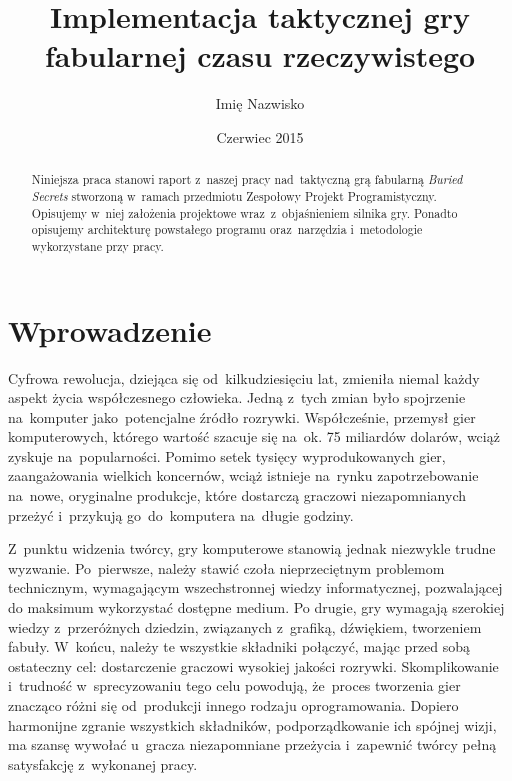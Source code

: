 \documentclass[licencjacka]{pracamgr}
\author	{Imię Nazwisko}
\title{Implementacja taktycznej gry fabularnej czasu rzeczywistego}
\date{Czerwiec 2015}
\begin{document}
\maketitle

\begin{abstract}
  Niniejsza praca stanowi raport z~naszej pracy nad~taktyczną grą fabularną \emph{Buried Secrets} stworzoną w~ramach przedmiotu Zespołowy Projekt
  Programistyczny. Opisujemy w~niej założenia projektowe wraz~z~objaśnieniem silnika gry. Ponadto opisujemy architekturę 
  powstałego programu oraz~narzędzia i~metodologie wykorzystane przy pracy.
\end{abstract}

\tableofcontents

\chapter*{Wprowadzenie}
  Cyfrowa rewolucja, dziejąca się od~kilkudziesięciu lat, zmieniła niemal każdy aspekt życia współczesnego człowieka.
  Jedną z~tych zmian było spojrzenie na~komputer jako~potencjalne źródło rozrywki. Współcześnie, przemysł
  gier komputerowych, którego wartość szacuje się na~ok. 75 miliardów dolarów\cite{CA}, wciąż zyskuje na~popularności.
  Pomimo setek tysięcy wyprodukowanych gier, zaangażowania wielkich koncernów, wciąż istnieje na~rynku zapotrzebowanie
  na~nowe, oryginalne produkcje, które dostarczą graczowi niezapomnianych przeżyć i~przykują go~do~komputera na~długie godziny.

  Z~punktu widzenia twórcy, gry komputerowe stanowią jednak niezwykle trudne wyzwanie. Po~pierwsze, należy stawić czoła
  nieprzeciętnym problemom technicznym, wymagającym wszechstronnej wiedzy informatycznej, pozwalającej do maksimum wykorzystać
  dostępne medium. Po drugie, gry wymagają szerokiej wiedzy z~przeróżnych dziedzin, związanych
  z~grafiką, dźwiękiem, tworzeniem fabuły. W~końcu, należy te wszystkie składniki połączyć, mając przed sobą ostateczny cel: dostarczenie
  graczowi wysokiej jakości rozrywki. Skomplikowanie i~trudność w~sprecyzowaniu tego celu powodują, że~proces tworzenia gier
  znacząco różni się od~produkcji innego rodzaju oprogramowania. Dopiero harmonijne zgranie wszystkich składników, podporządkowanie
  ich spójnej wizji, ma szansę wywołać u~gracza niezapomniane przeżycia i~zapewnić twórcy pełną satysfakcję z~wykonanej pracy.
\end{document}
